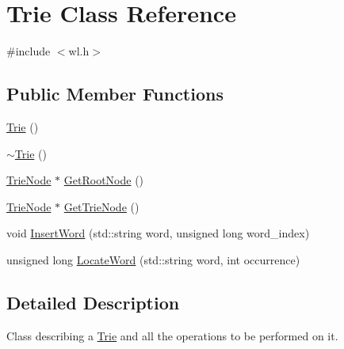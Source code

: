 \hypertarget{classTrie}{\section{Trie Class Reference}
\label{classTrie}
}


{\ttfamily \#include $<$wl.\-h$>$}

\subsection*{Public Member Functions}
\begin{DoxyCompactItemize}
\item 
\hyperlink{classTrie_a6af57e9f25d0d0a2d59eea5a4a802908}{Trie} ()
\item 
\hyperlink{classTrie_abf9d6f48d556e09d1b292412df153a4b}{$\sim$\-Trie} ()
\item 
\hyperlink{classTrieNode}{Trie\-Node} $\ast$ \hyperlink{classTrie_a83e327147b935fd0d767fec4be38003e}{Get\-Root\-Node} ()
\item 
\hyperlink{classTrieNode}{Trie\-Node} $\ast$ \hyperlink{classTrie_ab37aade00b97d03637287e74fb73ca00}{Get\-Trie\-Node} ()
\item 
void \hyperlink{classTrie_a960ae86ba5e1b78eac1701156e0533e3}{Insert\-Word} (std\-::string word, unsigned long word\-\_\-index)
\item 
unsigned long \hyperlink{classTrie_a7864cf9ba135aec75760d84b65c94969}{Locate\-Word} (std\-::string word, int occurrence)
\end{DoxyCompactItemize}


\subsection{Detailed Description}
Class describing a \hyperlink{classTrie}{Trie} and all the operations to be performed on it. 

